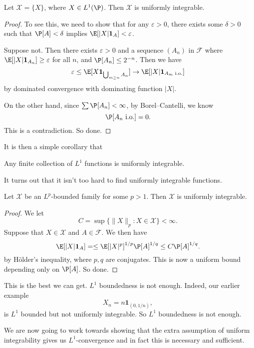 \documentclass[a4paper]{article}
\begin{document}
\begin{prop}
  Let $\mathcal{X} = \{X\}$, where $X \in L^1(\P)$. Then $\mathcal{X}$ is uniformly integrable.
\end{prop}

\begin{proof}
   To see this, we need to show that for any $\varepsilon > 0$, there exists some $\delta > 0$ such that $\P[A] < \delta$ implies $\E[|X|\mathbf{1}_A] < \varepsilon$.

  Suppose not. Then there exists $\varepsilon > 0$ and a sequence $(A_n)$ in $\mathcal{F}$ where $\E[|X|\mathbf{1}_{A_n}] \geq \varepsilon$ for all $n$, and $\P[A_n] \leq 2^{-n}$. Then we have
  \[
    \varepsilon \leq \E[X \mathbf{1}_{\bigcup_{m \geq n} A_n}] \to \E[|X| \mathbf{1}_{A_m\text{ i.o.}}]
  \]
  by dominated convergence with dominating function $|X|$.

  On the other hand, since $\sum \P[A_n] < \infty$, by Borel--Cantelli, we know
  \[
    \P[A_n\text{ i.o.}] = 0.
  \]
  This is a contradiction. So done.
\end{proof}

It is then a simple corollary that
\begin{cor}
  Any finite collection of $L^1$ functions is uniformly integrable.
\end{cor}

It turns out that it isn't too hard to find uniformly integrable functions.

\begin{prop}
  Let $\mathcal{X}$ be an $L^p$-bounded family for some $p > 1$. Then $\mathcal{X}$ is uniformly integrable.
\end{prop}

\begin{proof}
  We let
  \[
    C = \sup\{\|X\|_p : X \in \mathcal{X}\} < \infty.
  \]
  Suppose that $X \in \mathcal{X}$ and $A \in \mathcal{F}$. We then have
  \[
    \E[|X|\mathbf{1}_A] = \leq \E[|X|^p]^{1/p} \P[A]^{1/q} \leq C \P[A]^{1/q}.
  \]
  by H\"older's inequality, where $p, q$ are conjugates. This is now a uniform bound depending only on $\P[A]$. So done.
\end{proof}

This is the best we can get. $L^1$ boundedness is not enough. Indeed, our earlier example
\[
  X_n = n \mathbf{1}_{(0, 1/n)},
\]
is $L^1$ bounded but not uniformly integrable. So $L^1$ boundedness is not enough.

We are now going to work towards showing that the extra assumption of uniform integrability gives us $L^1$-convergence and in fact this is necessary and sufficient.
\end{document}
